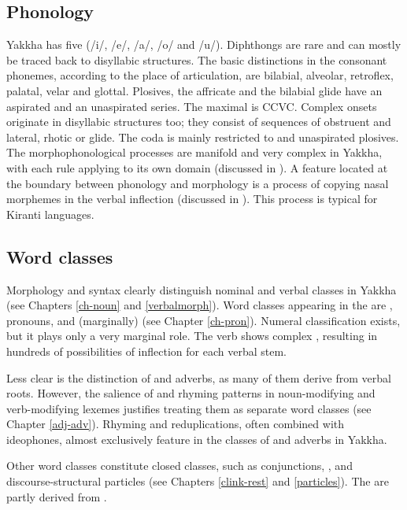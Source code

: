\subsection{Phonology}

Yakkha has five  (/i/, /e/, /a/, /o/ and /u/). Diphthongs are rare and can mostly be traced back to disyllabic structures. The basic distinctions in the consonant phonemes, according to  the place of articulation, are bilabial, alveolar, retroflex, palatal, velar and glottal. Plosives, the affricate and the bilabial glide have an aspirated and an unaspirated series. The maximal  is CCVC. Complex onsets originate in disyllabic structures too; they consist of sequences of obstruent and lateral, rhotic or glide. The  coda is mainly restricted to  and unaspirated plosives. The morphophonological processes are manifold and very complex in Yakkha, with each rule applying to its own domain (discussed in ). A feature located at the boundary between phonology and morphology is a process of copying nasal morphemes in the verbal inflection (discussed in ). This process is typical for Kiranti languages.


\subsection{Word classes}

Morphology and syntax clearly distinguish nominal and verbal classes in Yakkha (see Chapters \ref{ch-noun} and \ref{verbalmorph}). Word classes appearing in the  are , pronouns,   and (marginally)  (see Chapter \ref{ch-pron}). Numeral classification exists, but it plays only a very marginal role. The verb shows complex , resulting in hundreds of possibilities of inflection for each verbal stem. 


Less clear is the distinction of  and adverbs, as many of them derive from verbal roots. However, the salience of  and rhyming patterns in noun-modifying and verb-modifying lexemes justifies treating them as separate word classes (see Chapter \ref{adj-adv}). Rhym\-ing and reduplications, often combined with ideophones, almost exclusively feature in the classes of  and adverbs in Yakkha.


Other word classes constitute closed classes, such as conjunctions, ,  and discourse-structural particles (see Chapters  \ref{clink-rest} and \ref{particles}). The  are partly derived from . 



